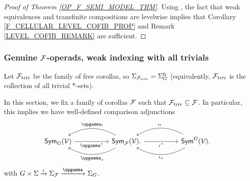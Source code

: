 \documentclass[a4paper,10pt]{article}%
\begin{document}
\begin{proof}[Proof of Theorem \ref{OP_F_SEMI_MODEL_THM}] 
  Using \cite[Lemma 2.3]{SS00}, the fact that weak equivalences and transfinite compositions are levelwise implies that Corollary \ref{F_CELLULAR_LEVEL_COFIB_PROP} and Remark \ref{LEVEL_COFIB_REMARK} are sufficient.
\end{proof} 













\newpage

\subsubsection{Genuine $\mathcal F$-operads, weak indexing with all trivials}


\begin{notation}
        Let $\mathcal F_{\text{triv}}$ be the family of free corollas, so 
        $\Sigma_{\mathcal F_{\text{triv}}} = \Sigma_G^{\text{fr}}$ 
        (equivalently, $\mathcal F_{\text{triv}}$ is the collection of all trivial $*$-sets).
\end{notation}

        In this section, we fix a family of corollas $\mathcal F$ such that $\mathcal F_{\text{triv}}\subseteq \mathcal F$. 
        In particular, this implies we have well-defined comparison adjunctions
       \[
        \begin{tikzcd}[column sep =5em]
                \mathsf{Sym}_G(\mathcal{V})
                \ar{r}[swap]{\upgamma^{\**}} 
                &
                \mathsf{Sym}_\F(\mathcal{V}) 
                \ar{r}[swap]{\iota^{\**}} 
                \ar[bend right]{l}[swap,midway]{\upgamma_{!}}
                \ar[bend left]{l}{\upgamma_{\**}}.
                &
                \mathsf{Sym}^G(\mathcal{V})
                \ar[bend right]{l}[swap,midway]{\iota_{!}}
                \ar[bend left]{l}{\iota_{\**}}.
        \end{tikzcd}
        \]
        with 
        $G \times \Sigma \xrightarrow{\iota} \Sigma_\F \xrightarrow{\upgamma} \Sigma_G$.
\end{document}
